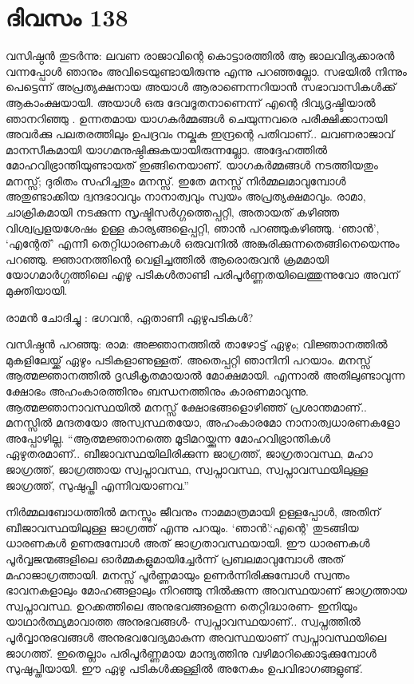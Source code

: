  
\section{ദിവസം 138}


വസിഷ്ഠൻ തുടർന്നു: ലവണ രാജാവിന്റെ കൊട്ടാരത്തിൽ ആ ജാലവിദ്യക്കാരൻ വന്നപ്പോൾ ഞാനും അവിടെയുണ്ടായിരുന്നു എന്നു പറഞ്ഞല്ലോ. സഭയിൽ നിന്നും പെട്ടെന്ന് അപ്രത്യക്ഷനായ അയാൾ ആരാണെന്നറിയാൻ സഭാവാസികൾക്ക് ആകാംക്ഷയായി. അയാൾ ഒരു ദേവദൂതനാണെന്ന് എന്റെ ദിവ്യദൃഷ്ടിയാൽ ഞാനറിഞ്ഞു . ഉന്നതമായ യാഗകർമ്മങ്ങൾ ചെയുന്നവരെ പരീക്ഷിക്കാനായി അവർക്കു പലതരത്തിലും ഉപദ്രവം നല്കുക ഇന്ദ്രന്റെ പതിവാണ്‌.. ലവണരാജാവ്‌ മാനസീകമായി യാഗമനുഷ്ഠിക്കുകയായിരുന്നല്ലോ. അദ്ദേഹത്തില്‍ മോഹവിഭ്രാന്തിയുണ്ടായത്  ഇങ്ങിനെയാണ്. യാഗകർമ്മങ്ങൾ നടത്തിയതും മനസ്സ്; ദുരിതം സഹിച്ചതും മനസ്സ്. ഇതേ മനസ്സ് നിർമ്മലമാവുമ്പോൾ അതുണ്ടാക്കിയ ദ്വന്ദഭാവവും നാനാത്വവും സ്വയം അപ്രത്യക്ഷമാവും. രാമാ, ചാക്രികമായി നടക്കുന്ന സൃഷ്ടിസർഗ്ഗത്തെപ്പറ്റി, അതായത്  കഴിഞ്ഞ വിശ്വപ്രളയശേഷം ഉള്ള കാര്യങ്ങളെപ്പറ്റി, ഞാൻ പറഞ്ഞുകഴിഞ്ഞു. ‘ഞാൻ’, ‘എന്റേത്’ എന്നീ തെറ്റിധാരണകൾ ഒരുവനിൽ അങ്കുരിക്കുന്നതെങ്ങിനെയെന്നും പറഞ്ഞു. ജ്ഞാനത്തിന്റെ വെളിച്ചത്തിൽ ആരൊരുവൻ ക്രമമായി യോഗമാർഗ്ഗത്തിലെ എഴു പടികൾതാണ്ടി പരിപൂർണ്ണതയിലെത്തുന്നുവോ അവന്‌ മുക്തിയായി.

രാമൻ ചോദിച്ചു : ഭഗവൻ, ഏതാണീ ഏഴുപടികൾ?

വസിഷ്ഠൻ പറഞ്ഞു: രാമ: അജ്ഞാനത്തിൽ താഴോട്ട് ഏഴും; വിജ്ഞാനത്തിൽ മുകളിലേയ്ക്ക് ഏഴും പടികളാണുള്ളത്. അതെപ്പറ്റി ഞാനിനി പറയാം. മനസ്സ് ആത്മജ്ഞാനത്തിൽ ദൃഢീകൃതമായാൽ മോക്ഷമായി. എന്നാല്‍ അതിലുണ്ടാവുന്ന ക്ഷോഭം അഹംകാരത്തിനും ബന്ധനത്തിനും കാരണമാവുന്നു. ആത്മജ്ഞാനാവസ്ഥയിൽ മനസ്സ് ക്ഷോഭങ്ങളൊഴിഞ്ഞ് പ്രശാന്തമാണ്‌.. മനസ്സിൽ മന്ദതയോ അസ്വസ്ഥതയോ, അഹംകാരമോ നാനാത്വധാരണകളോ അപ്പോഴില്ല. “ആത്മജ്ഞാനത്തെ മൂടിമറയ്ക്കുന്ന മോഹവിഭ്രാന്തികൾ ഏഴുതരമാണ്‌.. ബീജാവസ്ഥയിലിരിക്കുന്ന ജാഗ്രത്ത്, ജാഗ്രതാവസ്ഥ, മഹാ ജാഗ്രത്ത്, ജാഗ്രത്തായ സ്വപ്നാവസ്ഥ, സ്വപ്നാവസ്ഥ, സ്വപ്നാവസ്ഥയിലുള്ള ജാഗ്രത്ത്, സുഷുപ്തി എന്നിവയാണവ.”

നിർമ്മലബോധത്തിൽ മനസ്സും ജീവനും നാമമാത്രമായി ഉള്ളപ്പോൾ, അതിന്‌ ബീജാവസ്ഥയിലുള്ള ജാഗ്രത്ത് എന്നു പറയും. ‘ഞാൻ’.‘എന്റെ’ തുടങ്ങിയ ധാരണകൾ ഉണരുമ്പോൾ അത് ജാഗ്രതാവസ്ഥയായി. ഈ ധാരണകൾ പൂർവ്വജന്മങ്ങളിലെ ഓർമ്മകളുമായിച്ചേർന്ന് പ്രബലമാവുമ്പോൾ അത് മഹാജാഗ്രത്തായി. മനസ്സ് പൂർണ്ണമായും ഉണർന്നിരിക്കുമ്പോൾ സ്വന്തം ഭാവനകളാലും മോഹങ്ങളാലും നിറഞ്ഞു നില്‍ക്കുന്ന അവസ്ഥയാണ്‌ ജാഗ്രത്തായ സ്വപ്നാവസ്ഥ. ഉറക്കത്തിലെ അനുഭവങ്ങളെന്ന തെറ്റിദ്ധാരണ- ഇനിയും യാഥാർത്ഥ്യമാവാത്ത അനുഭവങ്ങൾ- സ്വപ്നാവസ്ഥയാണ്‌.. സ്വപ്നത്തിൽ പൂർവ്വാനുഭവങ്ങൾ അനുഭവവേദ്യമാകുന്ന അവസ്ഥയാണ്‌ സ്വപ്നാവസ്ഥയിലെ ജാഗത്ത്. ഇതെല്ലാം പരിപൂർണ്ണമായ മാന്ദ്യത്തിനു വഴിമാറിക്കൊടുക്കുമ്പോൾ സുഷുപ്തിയായി. ഈ ഏഴു പടികൾക്കുള്ളിൽ അനേകം ഉപവിഭാഗങ്ങളുണ്ട്.

